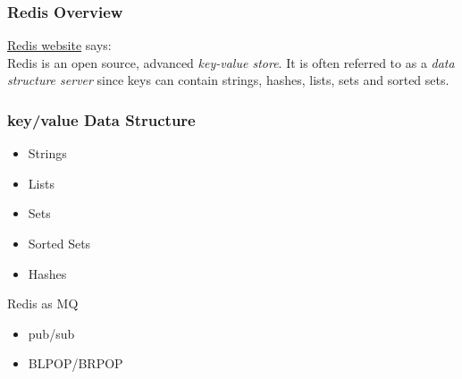 \documentclass{beamer}
\begin{document}
\begin{frame}
  \frametitle{Redis Overview}
  \href{http://redis.io}{Redis website} says: \\
  Redis is an open source, advanced \emph{key-value store}. It is often referred to as a \emph{data structure server} since keys can contain strings, hashes, lists, sets and sorted sets. \\
\end{frame}





\begin{frame}
  \frametitle{key/value Data Structure}
  \begin{itemize}
    \pause
  \item Strings \\
    \pause
  \item Lists \\
    \pause
  \item Sets \\
    \pause
  \item Sorted Sets \\
    \pause
  \item Hashes \\
  \end{itemize}
\end{frame}





\begin{frame}{Redis as MQ}
  \begin{itemize}
    \pause
  \item pub/sub \\
    \pause
  \item BLPOP/BRPOP \\
  \end{itemize}
\end{frame}
\end{document}
